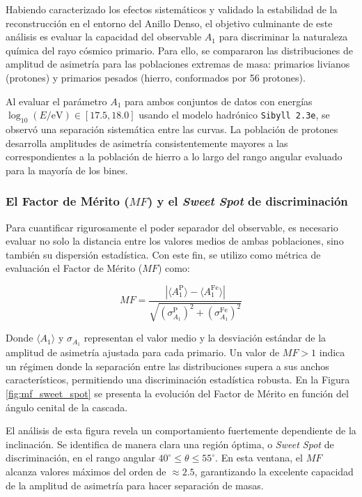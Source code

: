 Habiendo caracterizado los efectos sistemáticos y validado la estabilidad de la reconstrucción en el entorno del Anillo Denso, el objetivo culminante de este análisis es evaluar la capacidad del observable $A_1$ para discriminar la naturaleza química del rayo cósmico primario. Para ello, se compararon las distribuciones de amplitud de asimetría para las poblaciones extremas de masa: primarios livianos (protones) y primarios pesados (hierro, conformados por 56 protones). 

Al evaluar el parámetro $A_1$ para ambos conjuntos de datos con energías $\log_{10}(E/\mathrm{eV}) \in [17.5, 18.0]$ usando el modelo hadrónico \texttt{Sibyll 2.3e}, se observó una separación sistemática entre las curvas. La población de protones desarrolla amplitudes de asimetría consistentemente mayores a las correspondientes a la población de hierro a lo largo del rango angular evaluado para la mayoría de los bines.

\subsubsection{El Factor de Mérito ($MF$) y el \textit{Sweet Spot} de discriminación}
\label{subsec:sweet_spot}

Para cuantificar rigurosamente el poder separador del observable, es necesario evaluar no solo la distancia entre los valores medios de ambas poblaciones, sino también su dispersión estadística. Con este fin, se utilizo como métrica de evaluación el Factor de Mérito ($MF$) como:

\begin{equation}
	MF = \frac{|\langle A_1^{\text{P}} \rangle - \langle A_1^{\text{Fe}} \rangle|}{\sqrt{(\sigma_{A_1}^{\text{P}})^2 + (\sigma_{A_1}^{\text{Fe}})^2}}
\end{equation}

Donde $\langle A_1 \rangle$ y $\sigma_{A_1}$ representan el valor medio y la desviación estándar de la amplitud de asimetría ajustada para cada primario. Un valor de $MF > 1$ indica un régimen donde la separación entre las distribuciones supera a sus anchos característicos, permitiendo una discriminación estadística robusta. En la Figura \ref{fig:mf_sweet_spot} se presenta la evolución del Factor de Mérito en función del ángulo cenital de la cascada.

El análisis de esta figura revela un comportamiento fuertemente dependiente de la inclinación. Se identifica de manera clara una región óptima, o \textit{Sweet Spot} de discriminación, en el rango angular $40^\circ \leq \theta \leq 55^\circ$. En esta ventana, el $MF$ alcanza valores máximos del orden de $\approx 2.5$, garantizando la excelente capacidad de la amplitud de asimetría para hacer separación de masas.

